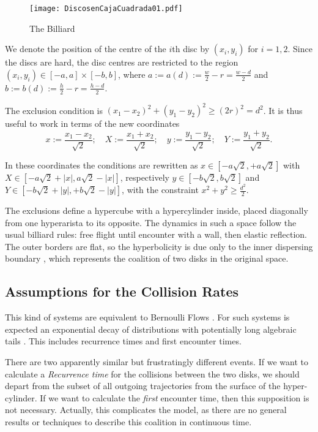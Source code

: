 \documentclass[a4paper,10pt, jcp, aps, preprint]{revtex4-1}
\newcommand{\defeq}{:=}
\begin{document}
\begin{figure}[h]
  \centering
  \texttt{[image: DiscosenCajaCuadrada01.pdf]}
  \caption{The Billiard}\label{billar01}
\end{figure}


We denote the position of the centre of the $i$th disc by 
$(x_{i}, y_{i})$ for $i=1,2$. Since the discs are hard, 
the disc centres are restricted to the region 
$(x_i, y_i) \in [-a,a] \times [-b, b]$, where 
$a \defeq a(d) \defeq \frac{w}{2} - r = \frac{w-d}{2}$ and
 $b \defeq b(d) \defeq \frac{h}{2} - r = \frac{h-d}{2}$.


The exclusion condition is $(x_1-x_2)^2 + (y_1-y_2)^2 \ge (2r)^2 = d^2$.
It is thus useful to work in terms of the new coordinates
\begin{equation}\label{cambiocoor01}
 x \defeq \frac{x_1 - x_2}{\sqrt{2}}; 
\quad X \defeq \frac{x_1 + x_2}{\sqrt{2}}; 
\quad y \defeq \frac{y_1 - y_2}{\sqrt{2}}; 
\quad Y \defeq \frac{y_1 + y_2}{\sqrt{2}}.
\end{equation}


In these coordinates the conditions are rewritten as
$x \in [-a \sqrt{2}, +a \sqrt{2}]$ with 
$X \in [-a \sqrt{2} + |x|, a \sqrt{2} - |x|]$, respectively 
 $y \in [-b \sqrt{2}, b \sqrt{2}]$ and $Y \in [-b \sqrt{2} + |y|, +b \sqrt{2} - |y|]$,  
with the constraint $x^2 + y^2 \ge \frac{d^2}{2}$.

The exclusions define a hypercube with a hypercylinder inside, placed diagonally 
from one hyperarista to its opposite. 
The dynamics in such a space follow
the usual billiard rules: free flight until
encounter with a wall, then elastic reflection.
The outer borders are flat, so the
hyperbolicity is due only to the inner dispersing
boundary \cite{Sim99}, which represents the coalition of
two disks in the original space.


\subsection{Assumptions for the Collision Rates}

This kind of systems are equivalent to Bernoulli Flows \cite{Gallavotti74}.
For such systems is expected an exponential decay of 
distributions \cite{AbadiGalves} with potentially
long algebraic tails \cite{ZasTip}. 
This includes recurrence times and
first encounter times. 

There are two apparently similar but frustratingly different events.
If we want to calculate a \emph{Recurrence time} for the collisions 
between the two disks, 
we should depart from the subset of all outgoing trajectories from the surface of the
hyper-cylinder. 
If we want to calculate the \emph{first} encounter time, then
this supposition is not necessary.
 Actually, this complicates
the model, as there are no general results or 
techniques to describe this coalition in continuous time. 
\end{document}
